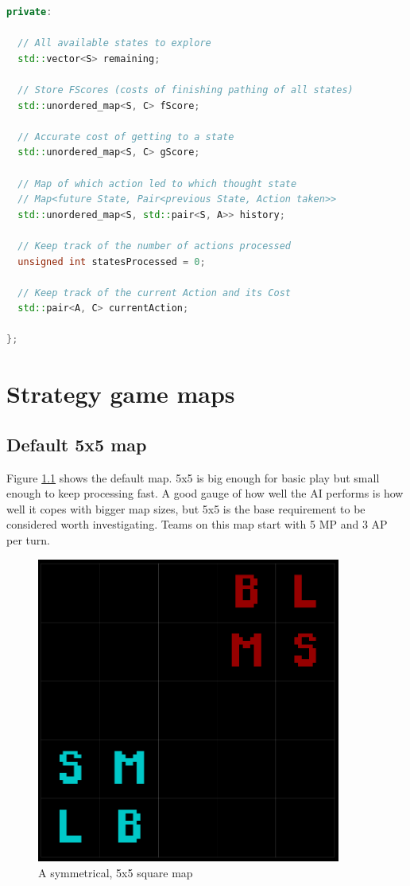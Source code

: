 \documentclass[11pt, a4paper]{report}
\begin{document}
\begin{appendices}
\begin{lstlisting}[language=C++]
private:

  // All available states to explore
  std::vector<S> remaining;

  // Store FScores (costs of finishing pathing of all states)
  std::unordered_map<S, C> fScore;

  // Accurate cost of getting to a state
  std::unordered_map<S, C> gScore;

  // Map of which action led to which thought state
  // Map<future State, Pair<previous State, Action taken>>
  std::unordered_map<S, std::pair<S, A>> history;

  // Keep track of the number of actions processed
  unsigned int statesProcessed = 0;

  // Keep track of the current Action and its Cost
  std::pair<A, C> currentAction;

};
\end{lstlisting}
\linespread{1.5}

\chapter{Strategy game maps}
\label{appendix:strategyGameMaps}

\section{Default 5x5 map}
\label{sec:mapDefault5x5}

Figure \ref{fig:mapDefault5x5} shows the default map. 5x5 is big enough for basic play but small enough to keep processing fast. A good gauge of how well the AI performs is how well it copes with bigger map sizes, but 5x5 is the base requirement to be considered worth investigating. Teams on this map start with 5 MP and 3 AP per turn.

\begin{figure}[!h]
  \centering
  \includegraphics[width=10cm]{img/map_default_5x5.png}
  \caption{A symmetrical, 5x5 square map}
  \label{fig:mapDefault5x5}
\end{figure}


\end{appendices}
\end{document}
